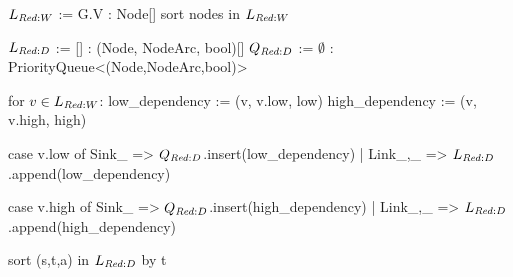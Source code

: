 \begin{blstlisting}
  $\ReduceLwork$ := G.V : Node[]
  sort nodes in $\ReduceLwork$

  $\ReduceLdep$ := [] : (Node, NodeArc, bool)[]
  $\ReduceQdep$ := $\emptyset$ : PriorityQueue<(Node,NodeArc,bool)>

  for $v \in \ReduceLwork$:
      low_dependency := (v, v.low, low)
      high_dependency := (v, v.high, high)

      case v.low of Sink{_}   => $\ReduceQdep$.insert(low_dependency)
                  | Link{_,_} => $\ReduceLdep$.append(low_dependency)

      case v.high of Sink{_}   => $\ReduceQdep$.insert(high_dependency)
                   | Link{_,_} => $\ReduceLdep$.append(high_dependency)

  sort (s,t,a) in $\ReduceLdep$ by t
\end{blstlisting}

